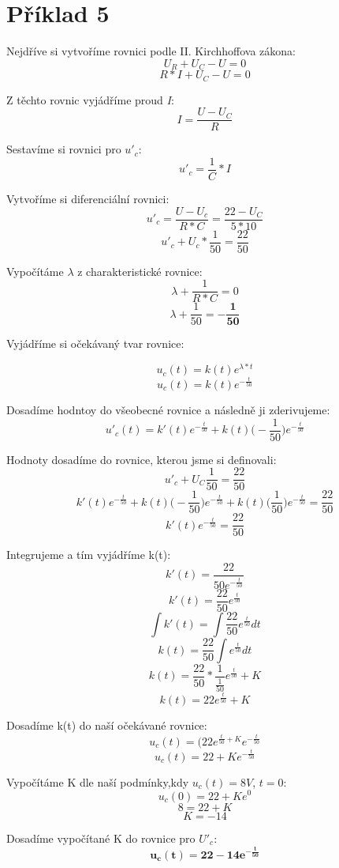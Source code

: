 \section{Příklad 5}

Nejdříve si vytvoříme rovnici podle II. Kirchhoffova zákona:
    $$U_R + U_C - U = 0$$
    $$R * I + U_C - U = 0$$

Z těchto rovnic vyjádříme proud \textit{I}:
    $$I = \frac{U - U_C}{R}$$

Sestavíme si rovnici pro $u'_c$:
    $$u'_c = \frac{1}{C} * I$$

Vytvoříme si diferenciální rovnici:
    $$u'_c = \frac{U - U_c}{R * C} = \frac{22 - U_C}{5 * 10}$$
    $$u'_c + U_c * \frac{1}{50} = \frac{22}{50}$$

Vypočítáme $\lambda$ z charakteristické rovnice:
    $$\lambda + \frac{1}{R * C} = 0$$
    $$\lambda + \frac{1}{50} = \mathbf{- \frac{1}{50}}$$

Vyjádříme si očekávaný tvar rovnice:

    $$u_c(t) = k(t)e^{\lambda * t}$$
    $$u_c(t) = k(t)e^{-\frac{t}{50}}$$

\newpage

Dosadíme hodntoy do všeobecné rovnice a následně ji zderivujeme:
    $$u'_c(t) = k'(t)e^{-\frac{t}{50}} + k(t) \Big(-\frac{1}{50}\Big) e^{-\frac{t}{50}}$$

Hodnoty dosadíme do rovnice, kterou jsme si definovali:
    $$u'_c + U_C \frac{1}{50} = \frac{22}{50}$$
    $$k'(t)e^{-\frac{t}{50}} + k(t) \Big(-\frac{1}{50}\Big)e^{-\frac{t}{50}} + k(t) \Big(\frac{1}{50}\Big)e^{-\frac{t}{50}} = \frac{22}{50}$$
    $$k'(t)e^{-\frac{t}{50}} = \frac{22}{50}$$

Integrujeme a tím vyjádříme k(t):
    $$k'(t) = \frac{22}{50e^{-\frac{t}{50}}} $$
    $$k'(t) = \frac{22}{50}e^{\frac{t}{50}}$$ 
    $$\int k'(t) = \int \frac{22}{50}e^{\frac{t}{50}}dt$$
    $$k(t) = \frac{22}{50} \int e^{\frac{t}{50}}dt$$
    $$k(t) = \frac{22}{50} * \frac{1}{\frac{1}{50}} e^{\frac{t}{50}} + K$$
    $$k(t) = 22e^{\frac{t}{50}} + K$$

Dosadíme k(t) do naší očekávané rovnice:
    $$u_c(t) = (22e^{\frac{t}{50} + K} e^{-\frac{t}{50}}$$
    $$u_c(t) = 22 + Ke^{-\frac{t}{50}}$$

Vypočítáme K dle naší podmínky,kdy  $u_c(t) = 8V$, $t = 0$:
    $$u_c(0) = 22 + Ke^0$$
    $$8 = 22 + K$$
    $$K = -14$$

Dosadíme vypočítané K do rovnice pro $U'_c$:
    $$\mathbf{u_c(t) = 22 - 14e^{-\frac{t}{50}}}$$


